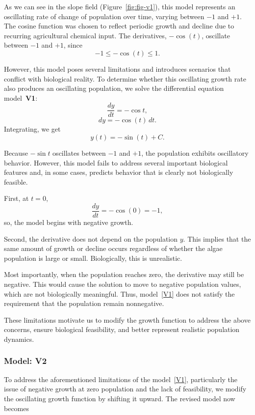 \documentclass[11pt]{article}
\begin{document}
As we can see in the slope field (Figure~\ref{fig:fig-v1}), this model represents an oscillating rate of change of population over time, varying between $-1$ and $+1$. The cosine function was chosen to reflect periodic growth and decline due to recurring agricultural chemical input. The derivatives, $-\cos(t)$, oscillate between $-1$ and $+1$, since
\[
    -1 \leq -\cos(t) \leq 1.
\]

However, this model poses several limitations and introduces scenarios that conflict with biological reality. To determine whether this oscillating growth rate also produces an oscillating population, we solve the differential equation model~\textbf{V1}:
\[
    \frac{dy}{dt} = -\cos t,
\]
\[
dy = -\cos(t) \, dt.
\]
Integrating, we get
\[
y(t) = -\sin(t) + C.
\]

Because $-\sin{t}$ oscillates between $-1$ and $+1$, the population exhibits oscillatory behavior. However, this model fails to address several important biological features and, in some cases, predicts behavior that is clearly not biologically feasible.

First, at $t = 0$,
\[
    \frac{dy}{dt} = -\cos(0) = -1,
\]
so, the model begins with negative growth. 

Second, the derivative does not depend on the population $y$. This implies that the same amount of growth or decline occurs regardless of whether the algae population is large or small. Biologically, this is unrealistic.

Most importantly, when the population reaches zero, the derivative may still be negative. This would cause the solution to move to negative population values, which are not biologically meaningful. Thus, model~\ref{V1} does not satisfy the requirement that the population remain nonnegative.

These limitations motivate us to modify the growth function to address the above concerns, ensure biological feasibility, and better represent realistic population dynamics.

\subsubsection{Model: V2}

To address the aforementioned limitations of the model~\ref{V1}, particularly the issue of negative growth at zero population and the lack of feasibility, we modify the oscillating growth function by shifting it upward. The revised model now becomes
\end{document}
